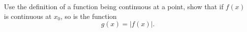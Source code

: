 \begin{exercise}
  \label{ex:hw05:absolute-value-continuity}
  Use the definition of a function being continuous at a point, show
  that if $f(x)$ is continuous at $x_0$, so is the function
  \[
    g(x)=|f(x)|.
  \]
\end{exercise}
